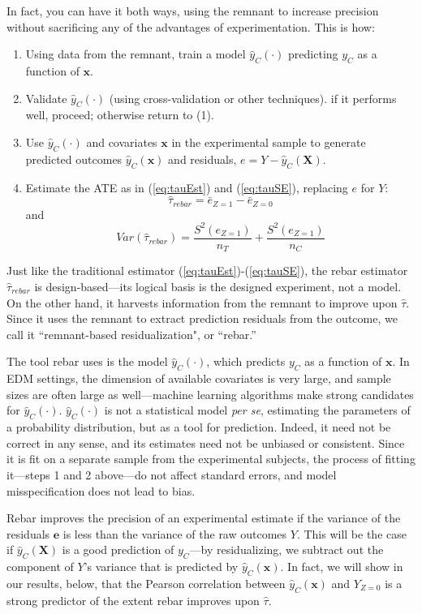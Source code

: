 \documentclass{edm_template}
\newcommand{\tauhat}{\hat{\tau}}
\newcommand{\rebar}{\hat{\tau}_{rebar}}
\newcommand{\model}[1]{\hat{y}_C(#1)}
\begin{document}
In fact, you can have it both ways, using the remnant to increase precision without sacrificing any of the advantages of experimentation. 
This is how:
\begin{enumerate}
 \item Using data from the remnant, train a model $\model{\cdot}$ predicting $y_C$ as a function of $\bm{x}$.
 \item Validate $\model{\cdot}$ (using cross-validation or other techniques). if it performs well, proceed; otherwise return to (1).
 \item Use $\model{\cdot}$ and covariates $\bm{x}$ in the experimental sample to generate predicted outcomes $\model{\bm{x}}$ and residuals, $e=Y-\model{\bm{X}}$.
 \item Estimate the ATE as in (\ref{eq:tauEst}) and (\ref{eq:tauSE}), replacing $e$ for $Y$:
 \begin{equation}\label{eq:rebarEst}
 \rebar=\bar{e}_{Z=1}-\bar{e}_{Z=0}
\end{equation}
and 
\begin{equation}\label{eq:rebarSE}
Var(\rebar)=\frac{S^2(e_{Z=1})}{n_T}+\frac{S^2(e_{Z=1})}{n_C}
\end{equation}
\end{enumerate}
Just like the traditional estimator (\ref{eq:tauEst})-(\ref{eq:tauSE}), the rebar estimator $\rebar$ is design-based---its logical basis is the designed experiment, not a model. 
On the other hand, it harvests information from the remnant to improve upon $\tauhat$.
Since it uses the remnant to extract prediction residuals from the outcome, we call it ``remnant-based residualization", or ``rebar.''

The tool rebar uses is the model $\model{\cdot}$, which predicts $y_C$ as a function of $\bm{x}$. 
In EDM settings, the dimension of available covariates is very large, and sample sizes are often large as well---machine learning algorithms make strong candidates for $\model{\cdot}$.
$\model{\cdot}$ is not a statistical model \emph{per se}, estimating the parameters of a probability distribution, but as a tool for prediction.
Indeed, it need not be correct in any sense, and its estimates need not be unbiased or consistent. 
Since it is fit on a separate sample from the experimental subjects, the process of fitting it---steps 1 and 2 above---do not affect standard errors, and model misspecification does not lead to bias.

Rebar improves the precision of an experimental estimate if the variance of the residuals $\bm{e}$ is less than the variance of the raw outcomes $Y$.
This will be the case if $\model{\bm{X}}$ is a good prediction of $y_C$---by residualizing, we subtract out the component of $Y$'s variance that is predicted by $\model{\bm{x}}$. 
In fact, we will show in our results, below, that the Pearson correlation between $\model{\bm{x}}$ and $Y_{Z=0}$ is a strong predictor of the extent rebar improves upon $\tauhat$. 
\end{document}
